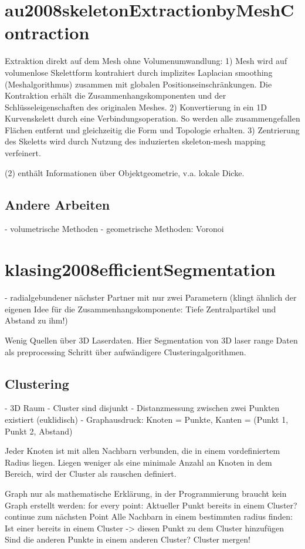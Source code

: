 \section{au2008skeletonExtractionbyMeshContraction}
\cite{au2008skeletonExtractionbyMeshContraction}
Extraktion direkt auf dem Mesh ohne Volumenumwandlung:
1) Mesh wird auf volumenlose Skelettform kontrahiert durch implizites Laplacian smoothing (Meshalgorithmus) zusammen mit globalen Positionseinschränkungen. Die Kontraktion erhält die Zusammenhangskomponenten und der Schlüsseleigenschaften des originalen Meshes.
2) Konvertierung in ein 1D Kurvenskelett durch eine Verbindungsoperation. So werden alle zusammengefallen Flächen entfernt und gleichzeitig die Form und Topologie erhalten.
3) Zentrierung des Skeletts wird durch Nutzung des induzierten skeleton-mesh mapping verfeinert.

(2) enthält Informationen über Objektgeometrie, v.a. lokale Dicke.

\subsection{Andere Arbeiten}

- volumetrische Methoden
- geometrische Methoden: Voronoi

\section{klasing2008efficientSegmentation}

- radialgebundener nächster Partner mit nur zwei Parametern (klingt ähnlich der eigenen Idee für die Zusammenhangskomponente: Tiefe Zentralpartikel und Abstand zu ihm!)

Wenig Quellen über 3D Laserdaten. Hier Segmentation von 3D laser range Daten als preprocessing Schritt über aufwändigere Clusteringalgorithmen.

\subsection{Clustering}
- 3D Raum
- Cluster sind disjunkt
- Distanzmessung zwischen zwei Punkten existiert (euklidisch)
- Graphausdruck: Knoten = Punkte, Kanten = (Punkt 1, Punkt 2, Abstand)

Jeder Knoten ist mit allen Nachbarn verbunden, die in einem vordefiniertem Radius liegen. Liegen weniger als eine minimale Anzahl an Knoten in dem Bereich, wird der Cluster als rauschen definiert.

Graph nur als mathematische Erklärung, in der Programmierung braucht kein Graph erstellt werden:
for every point:
  Aktueller Punkt bereits in einem Cluster? continue zum nächsten Point
  Alle Nachbarn in einem bestimmten radius finden:
	  Ist einer bereits in einem Cluster -> diesen Punkt zu dem Cluster hinzufügen
	  Sind die anderen Punkte in einem anderen Cluster? Cluster mergen!


